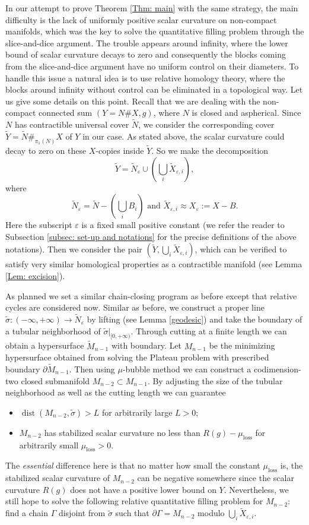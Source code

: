 \documentclass[11pt,letterpaper]{amsart}
\numberwithin{equation}{section}
\theoremstyle{definition}
\DeclareMathOperator{\dist}{dist}
\newcommand{\ve}{\varepsilon}
\begin{document}
In our attempt to prove Theorem \ref{Thm: main} with the same strategy, the main difficulty is the lack of uniformly positive scalar curvature on non-compact manifolds, which was the key to solve the quantitative filling problem through the slice-and-dice argument. The trouble appears around infinity, where the lower bound of scalar curvature decays to zero and consequently the blocks coming from the slice-and-dice argument have no uniform control on their diameters.
To handle this issue a natural idea is to use relative homology theory, where the blocks around infinity without control can be eliminated in a topological way. Let us give some details on this point. Recall that we are dealing with the non-compact connected sum $(Y=N\#X, g)$, where $N$ is closed and aspherical. Since $N$ has contractible universal cover $\tilde N$, we consider the corresponding cover $\tilde Y=\tilde N\#_{\pi_1(N)}X$ of $Y$ in our case. As stated above, the scalar curvature could decay to zero on these $X$-copies inside $\tilde Y$. So we make the decomposition $$
\tilde Y=\tilde N_{\ve}\cup\left(\bigcup_i \tilde X_{\ve,i}\right),$$
where
$$
\tilde N_\ve=\tilde N-\left(\bigcup_i B_i\right)\mbox{ and }\tilde X_{\ve,i}\approx X_\ve:=X-B.
$$
{Here the subscript $\ve$ is a fixed small positive constant (we refer the reader to Subsection \ref{subsec: set-up and notations} for the precise definitions of the above notations).} Then we consider the pair $(\tilde Y,\bigcup_i\tilde X_{\ve,i})$, which can be verified to satisfy very similar homological properties as a contractible manifold (see Lemma \ref{Lem: excision}).

As planned we set a similar chain-closing program as before except that relative cycles are considered now. Similar as before, we construct a proper line $\tilde\sigma:(-\infty,+\infty) \to \tilde N_\ve$ by lifting (see Lemma \ref{geodesic}) and take the boundary of a tubular neighborhood of $\tilde \sigma|_{[0,+\infty)}$. Through cutting at a finite length we can obtain a hypersurface $\tilde M_{n-1}$ with boundary. Let $M_{n-1}$ be the minimizing hypersurface obtained from solving the Plateau problem with prescribed boundary $\partial\tilde M_{n-1}$. Then using $\mu$-bubble method we can construct a codimension-two closed submanifold $M_{n-2} \subset M_{n-1}$. By adjusting the size of the tubular neighborhood as well as the cutting length we can guarantee
\begin{itemize}\setlength{\itemsep}{1mm}
\item $\dist(M_{n-2},\tilde \sigma)>L$ for arbitrarily large $L>0$;
\item $M_{n-2}$ has stabilized scalar curvature no less than $R(g)-\mu_{\mathrm{loss}}$ for arbitrarily small $\mu_{\mathrm{loss}}>0$.
\end{itemize}
The \emph{essential} difference here is that no matter how small the constant $\mu_{\mathrm{loss}}$ is, the stabilized scalar curvature of $M_{n-2}$ can be negative somewhere since the scalar curvature $R(g)$ does not have a positive lower bound on $Y$. Nevertheless, we still hope to solve the following relative quantitative filling problem for $M_{n-2}$: find a chain $\Gamma$ disjoint from $\tilde\sigma$ such that $\partial\Gamma=M_{n-2}$ modulo $\bigcup_i\tilde X_{\ve,i}$.
\end{document}
